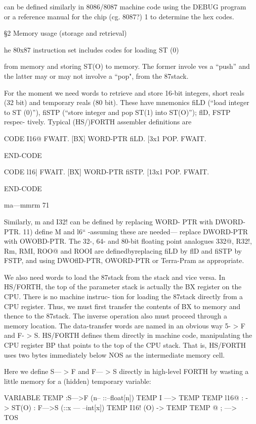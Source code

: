 {{ 

can be defined similarly in 8086/8087 machine code using the
DEBUG program or a reference manual for the chip (cg. 8087?) 1
to determine the hex codes.

§2 Memory usage (storage and retrieval)

he 80x87 instruction set includes codes for loading ST (0)

from memory and storing ST(O) to memory. The former invole
ves a “push” and the latter may or may not involve a “pop", from
the 87stack.

For the moment we need words to retrieve and store 16-bit
integers, short reals (32 bit) and temporary reals (80 bit).
These have mnemonics fiLD (“load integer to ST (0)”), fiSTP
(“store integer and pop ST(1) into ST(O)”); flD, FSTP respec-
tively. Typical (HS/)FORTH assembler definitions are

CODE I16@
FWAIT. [BX] WORD-PTR fiLD.
[3x1 POP.
FWAIT.

END-CODE

CODE l16|
FWAIT. [BX] WORD-PTR fiSTP.
[13x1 POP.
FWAIT.

END-CODE

ma—mmrm 71

Similarly, m and I32! can be defined by replacing WORD-
PTR with DWORD-PTR. 11) define M and l6“ -assuming
these are needed— replace DWORD-PTR with OWOBD-PTR.
The 32-, 64- and 80-bit floating point analogues 332@, R32!,
Rm, RMI, ROO@ and ROOI are definedbyreplacing fiLD
by flD and fiSTP by FSTP, and using DWOflD-PTR,
OWORD-PTR or Terra-Pram as appropriate.

We also need words to load the 87stack from the stack and vice
versa. In HS/FORTH, the top of the parameter stack is
actually the BX register on the CPU. There is no machine instruc-
tion for loading the 87stack directly from a CPU register. Thus,
we must first transfer the contents of BX to memory and thence
to the 87stack. The inverse operation also must proceed through
a memory location. The data-transfer words are named in an
obvious way 5- > F and F- > S. HS/FORTH defines them directly
in machine code, manipulating the CPU register BP that points
to the top of the CPU stack. That is, HS/FORTH uses two bytes
immediately below NOS as the intermediate memory cell.

Here we define S— > F and F— > S directly in high-level FORTH
by wasting a little memory for a (hidden) temporary variable:

VARIABLE TEMP
:S—>F (n-- ::--float[n])
TEMP I \TOS —> TEMP
TEMP l16@ : \TEMP-> ST(O)
: F—>S (::x — --int[x])
TEMP I16! \ST(O) -> TEMP
TEMP @ ; \TEMP—> TOS

}}
